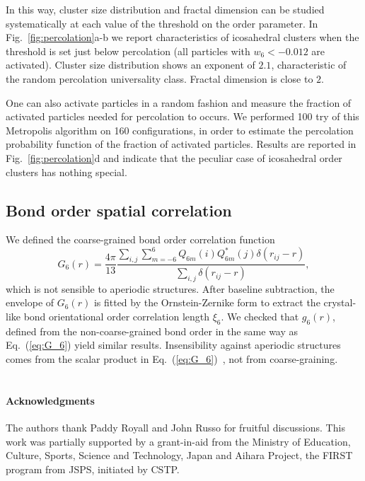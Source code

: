 In this way, cluster size distribution and fractal dimension can be studied systematically at each value of the threshold on the order parameter. In Fig.~\ref{fig:percolation}a-b we report characteristics of icosahedral clusters when the threshold is set just below percolation (all particles with $w_6<-0.012$ are activated). Cluster size distribution shows an exponent of $2.1$, characteristic of the random percolation universality class. Fractal dimension is close to $2$.

One can also activate particles in a random fashion and measure the fraction of activated particles needed for percolation to occurs. We performed 100 try of this Metropolis algorithm on 160 configurations, in order to estimate the percolation probability function of the fraction of activated particles. Results are reported in Fig.~\ref{fig:percolation}d and indicate that the peculiar case of icosahedral order clusters has nothing special.

\subsection*{Bond order spatial correlation}

We defined the coarse-grained bond order correlation function
\begin{equation}
	G_6(r) = \frac{4\pi}{13}\frac{\sum_{i,j} \sum_{m=-6}^{6} Q_{6 m}(i) Q_{6 m}^{*}(j) \delta(r_{ij}-r)}{\sum_{i,j} \delta(r_{ij}-r)},
	\label{eq:G_6}
\end{equation}
which is not sensible to aperiodic structures. After baseline subtraction, the envelope of $G_6(r)$ is fitted by the Ornstein-Zernike form to extract the crystal-like bond orientational order correlation length $\xi_6$. We checked that $g_6(r)$, defined from the non-coarse-grained bond order in the same way as Eq.~(\ref{eq:G_6}) yield similar results. Insensibility against aperiodic structures comes from the scalar product in Eq.~(\ref{eq:G_6})~\cite{Tomida1995}, not from coarse-graining.

%



\section*{}
\paragraph*{\bf Acknowledgments}
The authors thank Paddy Royall and John Russo for fruitful discussions. 
This work was partially supported by a grant-in-aid from the 
Ministry of Education, Culture, Sports, Science and Technology, Japan and 
Aihara Project, the FIRST program from JSPS, initiated by CSTP. 

